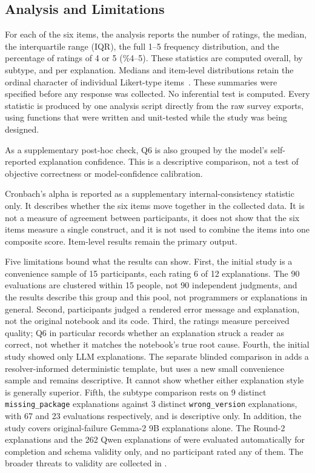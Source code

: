 \subsection{Analysis and Limitations}
\label{sec:v-human-eval-analysis}
\label{sec:v-human-eval-limitations}

For each of the six items, the analysis reports the number of ratings,
the median, the interquartile range (IQR), the full 1--5 frequency
distribution, and the percentage of ratings of 4 or 5 (\%4--5). These
statistics are computed overall, by subtype, and per explanation. Medians and
item-level distributions retain the ordinal character of individual
Likert-type items~\cite{sullivan2013likert}. These summaries were specified
before any response was collected. No inferential
test is computed. Every statistic is produced by one analysis script
directly from the raw survey exports, using functions that were written
and unit-tested while the study was being designed.

As a supplementary post-hoc check, Q6 is also grouped by the model's
self-reported explanation confidence. This is a descriptive comparison,
not a test of objective correctness or model-confidence calibration.

Cronbach's alpha is reported as a supplementary internal-consistency
statistic only. It describes whether the six items move together in the
collected data. It is not a measure of agreement between participants,
it does not show that the six items measure a single construct, and it
is not used to combine the items into one composite score. Item-level
results remain the primary output.

Five limitations bound what the results can show. First, the initial study is a
convenience sample of 15 participants, each rating 6 of 12 explanations.
The 90 evaluations are clustered within 15 people, not 90 independent
judgments, and the results describe this group and this pool, not
programmers or explanations in general. Second, participants judged a
rendered error message and explanation, not the original notebook and
its code. Third, the ratings measure perceived quality; Q6 in
particular records whether an explanation struck a reader as correct,
not whether it matches the notebook's true root cause. Fourth, the initial
study showed only LLM explanations. The separate blinded comparison in
 adds a resolver-informed deterministic
template, but uses a new small convenience sample and remains descriptive. It
cannot show whether either explanation style is generally superior. Fifth, the subtype comparison rests on 9
distinct \texttt{missing\_package} explanations against 3 distinct
\texttt{wrong\_version} explanations, with 67 and 23 evaluations
respectively, and is descriptive only. In addition, the study covers
original-failure Gemma-2 9B explanations alone. The Round-2
explanations and the 262 Qwen explanations of
 were evaluated
automatically for completion and schema validity only, and no participant
rated any of them. The broader
threats to validity are collected in .

